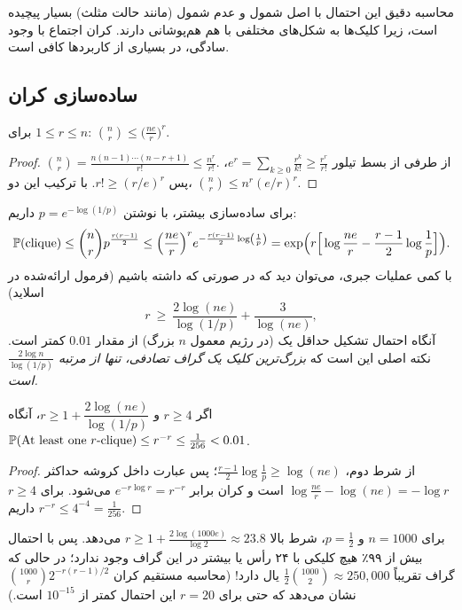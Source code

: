 \begin{note}
\notetitle محاسبه دقیق این احتمال با اصل شمول و عدم شمول (مانند حالت مثلث) بسیار پیچیده است، زیرا کلیک‌ها به شکل‌های مختلفی با هم هم‌پوشانی دارند. کران اجتماع با وجود سادگی، در بسیاری از کاربردها کافی است.
\end{note}

\subsection{ساده‌سازی کران}
\begin{theorem}
برای $1\le r\le n$:
$\displaystyle\binom nr\le\Big(\frac{ne}{r}\Big)^r$.
\end{theorem}
\begin{proof}
$\binom nr=\frac{n(n-1)\cdots(n-r+1)}{r!}\le\frac{n^r}{r!}$. از طرفی از بسط تیلور $e^r=\sum_{k\ge0}\frac{r^k}{k!}\ge\frac{r^r}{r!}$، پس $r!\ge(r/e)^r$. با ترکیب این دو، $\binom nr\le n^r(e/r)^r$.
\end{proof}

برای ساده‌سازی بیشتر، با نوشتن $p=e^{-\log(1/p)}$ داریم:
\[
\mathbb{P}(\text{clique})\le\binom nr p^{\frac{r(r-1)}{2}}\le\Big(\frac{ne}{r}\Big)^r e^{-\frac{r(r-1)}{2}\log\left(\frac1p\right)}
=\exp\!\Big(r\Big[\log\frac{ne}{r}-\frac{r-1}{2}\log\frac1p\Big]\Big).
\]
با کمی عملیات جبری، می‌توان دید که در صورتی که داشته باشیم (فرمول ارائه‌شده در اسلاید)
\[
r\ \ge\ \frac{2\log(ne)}{\log(1/p)}+\frac{3}{\log(ne)},
\]
آنگاه احتمال تشکیل حداقل یک  (در رژیم معمول $n$ بزرگ) از مقدار $0.01$ کمتر است. نکته اصلی این است که \emph{بزرگ‌ترین کلیک یک گراف تصادفی، تنها از مرتبه $\frac{2\log n}{\log(1/p)}$ است.}

\begin{theorem}
اگر $r\ge4$ و $r\ge1+\dfrac{2\log(ne)}{\log(1/p)}$، آنگاه $\mathbb{P}(\text{At least one } r\text{-clique})\le r^{-r}\le\frac1{256}<0.01$.
\end{theorem}
\begin{proof}
از شرط دوم، $\frac{r-1}{2}\log\frac1p\ge\log(ne)$؛ پس عبارت داخل کروشه حداکثر $\log\frac{ne}{r}-\log(ne)=-\log r$ است و کران برابر $e^{-r\log r}=r^{-r}$ می‌شود. برای $r\ge4$ داریم $r^{-r}\le4^{-4}=\frac1{256}$.
\end{proof}

\begin{example}
برای $n=1000$ و $p=\frac12$، شرط بالا $r\ge1+\frac{2\log(1000e)}{\log2}\approx23.8$ می‌دهد. پس با احتمال بیش از ۹۹٪ هیچ کلیکی با ۲۴ رأس یا بیشتر در این گراف وجود ندارد؛ در حالی که گراف تقریباً $\frac12\binom{1000}{2}\approx250{,}000$ یال دارد! (محاسبه مستقیم کران $\binom{1000}{r}2^{-r(r-1)/2}$ نشان می‌دهد که حتی برای $r=20$ این احتمال کمتر از $10^{-15}$ است.)
\end{example}

